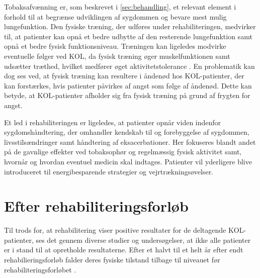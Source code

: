 Tobaksafvænning er, som beskrevet i \autoref{sec:behandling}, et relevant element i forhold til at begrænse udviklingen af sygdommen og bevare mest mulig lungefunktion. Den fysiske træning, der udføres under rehabiliteringen, medvirker til, at patienter kan opnå et bedre udbytte af den resterende lungefunktion samt opnå et bedre fysisk funktionsniveau.\cite{Sundhedsstyrelsen2015}
Træningen kan ligeledes modvirke eventuelle følger ved KOL, da fysisk træning øger muskelfunktionen samt udsætter træthed, hvilket medfører øget aktivitetstolerance \cite{McCarthy2015}. 
En problematik kan dog ses ved, at fysisk træning kan resultere i åndenød hos KOL-patienter, der kan forstærkes, hvis patienter påvirkes af angst som følge af åndenød. Dette kan betyde, at KOL-patienter afholder sig fra fysisk træning på grund af frygten for angst.\cite{McCarthy2015, Sundhedsstyrelsen2015} 

Et led i rehabiliteringen er ligeledes, at patienter opnår viden indenfor sygdomshåndtering, der omhandler kendskab til og forebyggelse af sygdommen, livsstilsændringer samt håndtering af eksacerbationer. Her fokuseres blandt andet på de gavnlige effekter ved tobaksophør og regelmæssig fysisk aktivitet samt, hvornår og hvordan eventuel medicin skal indtages. Patienter vil yderligere blive introduceret til energibesparende strategier og vejrtrækningsøvelser.\cite{McCarthy2015,Sundhedsstyrelsen2015}    

\section{Efter rehabiliteringsforløb} \label{sec:efterRehabilitering}
Til trods for, at rehabilitering viser positive resultater for de deltagende KOL-patienter, ses det gennem diverse studier og undersøgelser, at ikke alle patienter er i stand til at opretholde resultaterne.
Efter et halvt til et helt år efter endt rehabilieringsforløb falder deres fysiske tilstand tilbage til niveauet før rehabiliteringsforløbet \cite{Egan2012,Beachamp2013,Zanaboni2017,Ringbaek2008}. 

